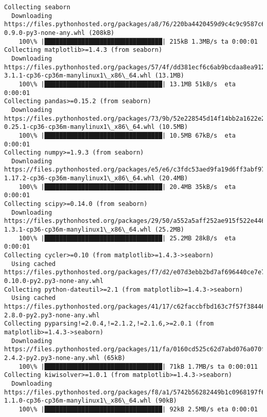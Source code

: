 \documentclass[11pt]{article}
\begin{document}
    \begin{Verbatim}[commandchars=\\\{\}]
Collecting seaborn
  Downloading https://files.pythonhosted.org/packages/a8/76/220ba4420459d9c4c9c9587c6ce607bf56c25b3d3d2de62056efe482dadc/seaborn-0.9.0-py3-none-any.whl (208kB)
    100\% |████████████████████████████████| 215kB 1.3MB/s ta 0:00:01
Collecting matplotlib>=1.4.3 (from seaborn)
  Downloading https://files.pythonhosted.org/packages/57/4f/dd381ecf6c6ab9bcdaa8ea912e866dedc6e696756156d8ecc087e20817e2/matplotlib-3.1.1-cp36-cp36m-manylinux1\_x86\_64.whl (13.1MB)
    100\% |████████████████████████████████| 13.1MB 51kB/s  eta 0:00:01
Collecting pandas>=0.15.2 (from seaborn)
  Downloading https://files.pythonhosted.org/packages/73/9b/52e228545d14f14bb2a1622e225f38463c8726645165e1cb7dde95bfe6d4/pandas-0.25.1-cp36-cp36m-manylinux1\_x86\_64.whl (10.5MB)
    100\% |████████████████████████████████| 10.5MB 67kB/s  eta 0:00:01
Collecting numpy>=1.9.3 (from seaborn)
  Downloading https://files.pythonhosted.org/packages/e5/e6/c3fdc53aed9fa19d6ff3abf97dfad768ae3afce1b7431f7500000816bda5/numpy-1.17.2-cp36-cp36m-manylinux1\_x86\_64.whl (20.4MB)
    100\% |████████████████████████████████| 20.4MB 35kB/s  eta 0:00:01
Collecting scipy>=0.14.0 (from seaborn)
  Downloading https://files.pythonhosted.org/packages/29/50/a552a5aff252ae915f522e44642bb49a7b7b31677f9580cfd11bcc869976/scipy-1.3.1-cp36-cp36m-manylinux1\_x86\_64.whl (25.2MB)
    100\% |████████████████████████████████| 25.2MB 28kB/s  eta 0:00:01
Collecting cycler>=0.10 (from matplotlib>=1.4.3->seaborn)
  Using cached https://files.pythonhosted.org/packages/f7/d2/e07d3ebb2bd7af696440ce7e754c59dd546ffe1bbe732c8ab68b9c834e61/cycler-0.10.0-py2.py3-none-any.whl
Collecting python-dateutil>=2.1 (from matplotlib>=1.4.3->seaborn)
  Using cached https://files.pythonhosted.org/packages/41/17/c62faccbfbd163c7f57f3844689e3a78bae1f403648a6afb1d0866d87fbb/python\_dateutil-2.8.0-py2.py3-none-any.whl
Collecting pyparsing!=2.0.4,!=2.1.2,!=2.1.6,>=2.0.1 (from matplotlib>=1.4.3->seaborn)
  Downloading https://files.pythonhosted.org/packages/11/fa/0160cd525c62d7abd076a070ff02b2b94de589f1a9789774f17d7c54058e/pyparsing-2.4.2-py2.py3-none-any.whl (65kB)
    100\% |████████████████████████████████| 71kB 1.7MB/s ta 0:00:011
Collecting kiwisolver>=1.0.1 (from matplotlib>=1.4.3->seaborn)
  Downloading https://files.pythonhosted.org/packages/f8/a1/5742b56282449b1c0968197f63eae486eca2c35dcd334bab75ad524e0de1/kiwisolver-1.1.0-cp36-cp36m-manylinux1\_x86\_64.whl (90kB)
    100\% |████████████████████████████████| 92kB 2.5MB/s eta 0:00:01

\end{Verbatim}
\end{document}
